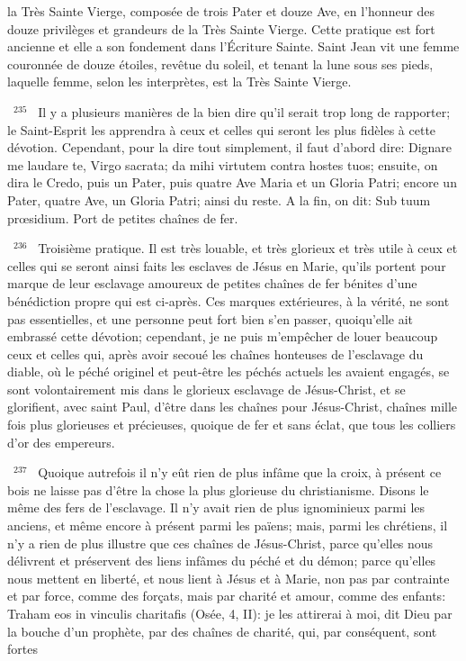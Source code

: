 \documentclass[paper=a5,pagesize=pdftex,fontsize=15pt,headinclude=on,twoside=off]{scrbook}
\newcommand{\negphantom}[1]{\settowidth{\dimen0}{#1}\hspace*{-\dimen0}}
\newcommand{\versenb}[1]{\par \vspace{10pt}~\negphantom{~${}^{#1}$~}${}^{#1}$~}
\begin{document}
la Très Sainte Vierge, composée de trois Pater et douze Ave, en l'honneur des douze privilèges et grandeurs de la
Très Sainte Vierge. Cette pratique est fort ancienne et elle a son fondement dans l'Écriture Sainte. Saint Jean vit
une femme couronnée de douze étoiles, revêtue du soleil, et tenant la lune sous ses pieds, laquelle femme, selon
les interprètes, est la Très Sainte Vierge.
\versenb{235} Il y a plusieurs manières de la bien dire qu'il serait trop long de rapporter; le Saint-Esprit les apprendra à ceux
et celles qui seront les plus fidèles à cette dévotion. Cependant, pour la dire tout simplement, il faut d'abord dire:
Dignare me laudare te, Virgo sacrata; da mihi virtutem contra hostes tuos; ensuite, on dira le Credo, puis un Pater,
puis quatre Ave Maria et un Gloria Patri; encore un Pater, quatre Ave, un Gloria Patri; ainsi du reste. A la fin, on dit:
Sub tuum prœsidium.
Port de petites chaînes de fer.
\versenb{236} Troisième pratique. Il est très louable, et très glorieux et très utile à ceux et celles qui se seront ainsi faits les
esclaves de Jésus en Marie, qu'ils portent pour marque de leur esclavage amoureux de petites chaînes de fer
bénites d'une bénédiction propre qui est ci-après.
Ces marques extérieures, à la vérité, ne sont pas essentielles, et une personne peut fort bien s'en passer,
quoiqu'elle ait embrassé cette dévotion; cependant, je ne puis m'empêcher de louer beaucoup ceux et celles qui,
après avoir secoué les chaînes honteuses de l'esclavage du diable, où le péché originel et peut-être les péchés
actuels les avaient engagés, se sont volontairement mis dans le glorieux esclavage de Jésus-Christ, et se
glorifient, avec saint Paul, d'être dans les chaînes pour Jésus-Christ, chaînes mille fois plus glorieuses et
précieuses, quoique de fer et sans éclat, que tous les colliers d'or des empereurs.
\versenb{237} Quoique autrefois il n'y eût rien de plus infâme que la croix, à présent ce bois ne laisse pas d'être la chose la
plus glorieuse du christianisme. Disons le même des fers de l'esclavage. Il n'y avait rien de plus ignominieux parmi
les anciens, et même encore à présent parmi les païens; mais, parmi les chrétiens, il n'y a rien de plus illustre que
ces chaînes de Jésus-Christ, parce qu'elles nous délivrent et préservent des liens infâmes du péché et du démon;
parce qu'elles nous mettent en liberté, et nous lient à Jésus et à Marie, non pas par contrainte et par force, comme
des forçats, mais par charité et amour, comme des enfants: Traham eos in vinculis charitafis (Osée, 4, II): je les
attirerai à moi, dit Dieu par la bouche d'un prophète, par des chaînes de charité, qui, par conséquent, sont fortes
\end{document}
